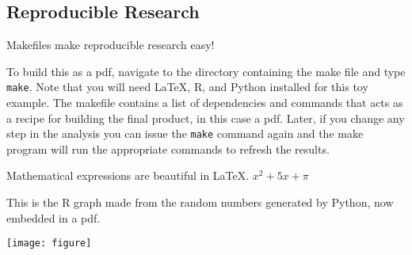 \documentclass[12pt]{article}
\begin{document}
\subsection*{Reproducible Research}

Makefiles make reproducible research easy! 

To build this as a pdf, navigate to the directory containing the make file and type {\tt make}. Note that you will need \LaTeX, R, and Python installed for this toy example. The makefile contains a list of dependencies and commands that acts as a recipe for building the final product, in this case a pdf. Later, if you change any step in the analysis you can issue the {\tt make} command again and the make program will run the appropriate commands to refresh the results.

Mathematical expressions are beautiful in \LaTeX. $x^2 + 5x + \pi$

This is the R graph made from the random numbers generated by Python, now embedded in a pdf.

\texttt{[image: figure]}  
\end{document}
